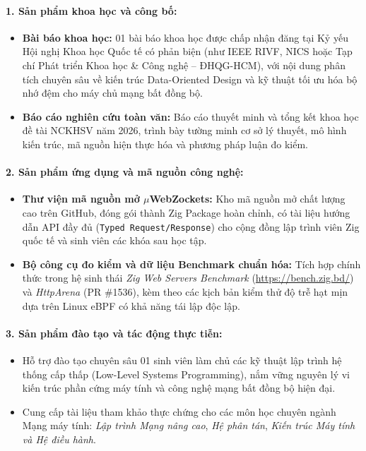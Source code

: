 \documentclass[letterpaper]{article}
\begin{document}
\paragraph{1. Sản phẩm khoa học và công bố:}
\begin{itemize}
    \item \textbf{Bài báo khoa học:} 01 bài báo khoa học được chấp nhận đăng tại Kỷ yếu Hội nghị Khoa học Quốc tế có phản biện (như IEEE RIVF, NICS hoặc Tạp chí Phát triển Khoa học \& Công nghệ -- ĐHQG-HCM), với nội dung phân tích chuyên sâu về kiến trúc Data-Oriented Design và kỹ thuật tối ưu hóa bộ nhớ đệm cho máy chủ mạng bất đồng bộ.
    \item \textbf{Báo cáo nghiên cứu toàn văn:} Báo cáo thuyết minh và tổng kết khoa học đề tài NCKHSV năm 2026, trình bày tường minh cơ sở lý thuyết, mô hình kiến trúc, mã nguồn hiện thực hóa và phương pháp luận đo kiểm.
\end{itemize}

\paragraph{2. Sản phẩm ứng dụng và mã nguồn công nghệ:}
\begin{itemize}
    \item \textbf{Thư viện mã nguồn mở $\mu$WebZockets:} Kho mã nguồn mở chất lượng cao trên GitHub, đóng gói thành Zig Package hoàn chỉnh, có tài liệu hướng dẫn API đầy đủ (\texttt{Typed Request/Response}) cho cộng đồng lập trình viên Zig quốc tế và sinh viên các khóa sau học tập.
    \item \textbf{Bộ công cụ đo kiểm và dữ liệu Benchmark chuẩn hóa:} Tích hợp chính thức trong hệ sinh thái \textit{Zig Web Servers Benchmark} (\url{https://bench.zig.bd/}) và \textit{HttpArena} (PR \#1536), kèm theo các kịch bản kiểm thử độ trễ hạt mịn dựa trên Linux eBPF có khả năng tái lập độc lập.
\end{itemize}

\paragraph{3. Sản phẩm đào tạo và tác động thực tiễn:}
\begin{itemize}
    \item Hỗ trợ đào tạo chuyên sâu 01 sinh viên làm chủ các kỹ thuật lập trình hệ thống cấp thấp (Low-Level Systems Programming), nắm vững nguyên lý vi kiến trúc phần cứng máy tính và công nghệ mạng bất đồng bộ hiện đại.
    \item Cung cấp tài liệu tham khảo thực chứng cho các môn học chuyên ngành Mạng máy tính: \emph{Lập trình Mạng nâng cao}, \emph{Hệ phân tán}, \emph{Kiến trúc Máy tính và Hệ điều hành}.
\end{itemize}
\end{document}

